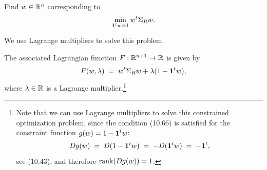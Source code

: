 Find $w\in\mathbb{R}^n$ corresponding to
\[
\min_{\mathbf{1}^tw=1} w^t\Sigma_Rw.
\]

We use Lagrange multipliers to solve this problem.

The associated Lagrangian function $F:\mathbb{R}^{n+1}\to\mathbb{R}$ is given by
\[
F(w,\lambda) \;=\; w^t\Sigma_Rw+\lambda(1-\mathbf{1}^tw),
\]
where $\lambda\in\mathbb{R}$ is a Lagrange multiplier.\footnote{Note that we can use Lagrange
multipliers to solve this constrained optimization problem, since the condition
(10.66) is satisfied for the constraint function $g(w)=1-\mathbf{1}^tw$:
\[
Dg(w) \;=\; D(1-\mathbf{1}^tw) \;=\; -D(\mathbf{1}^tw) \;=\; -\mathbf{1}^t,
\]
see (10.43), and therefore $\operatorname{rank}(Dg(w))=1$.}
